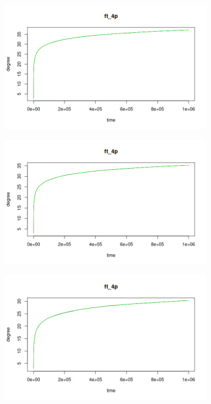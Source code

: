 \begin{figure}[ht]
\centering
\begin{subfigure}{.5\textwidth}
  \centering
  \includegraphics[width=\linewidth]{figures/scaling_fits/fit_ra_0.png}
\end{subfigure}%
\begin{subfigure}{.5\textwidth}
  \centering
  \includegraphics[width=\linewidth]{figures/scaling_fits/fit_ra_1.png}
\end{subfigure}
\begin{subfigure}{.5\textwidth}
  \centering
  \includegraphics[width=\linewidth]{figures/scaling_fits/fit_ra_2.png}

\end{subfigure}
\end{figure}

